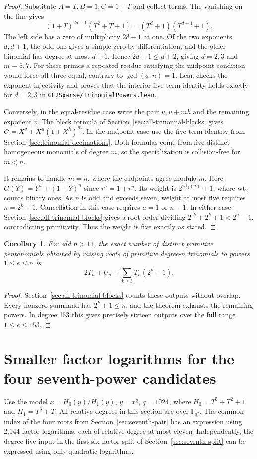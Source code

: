 \documentclass[11pt]{article}
\newtheorem{corollary}[theorem]{Corollary}
\begin{document}
\begin{proof}
Substitute \(A=T,B=1,C=1+T\) and collect terms. The vanishing on
the line gives
\[
       (1+T)^{2d-1}(T^2+T+1)=(T^d+1)(T^{d+1}+1).
\]
The left side has a zero of multiplicity \(2d-1\) at one. Of the
two exponents \(d,d+1\), the odd one gives a simple zero by
differentiation, and the other binomial has degree at most \(d+1\).
Hence \(2d-1\le d+2\), giving \(d=2,3\) and \(m=5,7\).
For these primes a repeated residue satisfying the midpoint
condition would force all three equal, contrary to \(\gcd(a,n)=1\).
Lean checks the exponent injectivity and proves that the interior
five-term identity holds exactly for \(d=2,3\) in
\nolinkurl{GF2Sparse/TrinomialPowers.lean}.

Conversely, in the equal-residue case write the pair \(u,u+mh\)
and the remaining exponent \(v\). The block formula of
Section~\ref{sec:all-trinomial-blocks} gives \(G=X^v+X^u(1+X^h)^m\).
In the midpoint case use the five-term identity from
Section~\ref{sec:trinomial-decimations}. Both formulas come from
five distinct homogeneous monomials of degree \(m\), so the
specialization is collision-free for \(m<n\).

It remains to handle \(m=n\), where the endpoints agree modulo \(m\).
Here \(G(Y)=Y^a+(1+Y)^n\) since \(r^a=1+r^n\). Its weight is
\(2^{\mathrm{wt}_2(n)}\pm1\), where \(\mathrm{wt}_2\) counts binary
ones. As \(n\) is odd and exceeds seven, weight at most five
requires \(n=2^k+1\). Cancellation in this case requires \(a=1\)
or \(n-1\). In either case Section~\ref{sec:all-trinomial-blocks}
gives a root order dividing \(2^{2k}+2^k+1<2^n-1\), contradicting
primitivity. Thus the weight is five exactly as stated.
\end{proof}

\begin{corollary}
For odd \(n>11\), the exact number of distinct primitive pentanomials
obtained by raising roots of primitive degree-\(n\) trinomials to
powers \(1\le e\le n\) is
\[
          2T_n+U_n+\sum_{k\ge3}T_n(2^k+1).
\]
\end{corollary}
\begin{proof}
Section~\ref{sec:all-trinomial-blocks} counts these outputs without
overlap. Every nonzero summand has \(2^k+1\le n\), and the theorem
exhausts the remaining powers. In degree 153 this gives precisely
sixteen outputs over the full range \(1\le e\le153\).
\end{proof}

\section{Smaller factor logarithms for the four seventh-power candidates}
\label{sec:seventh-descent}
Use the model \(x=H_0(y)/H_1(y)\), \(y=x^q\), \(q=1024\), where
\(H_0=T^5+T^2+1\) and \(H_1=T^3+T\). All relative degrees in this
section are over \(\mathbb F_{q^2}\). The common index of the four
roots from Section~\ref{sec:seventh-pair} has an expression using
2,144 factor logarithms, each of relative degree at most eleven.
Independently, the degree-five input in the first six-factor split
of Section~\ref{sec:seventh-split} can be expressed using only
quadratic logarithms.
\end{document}
